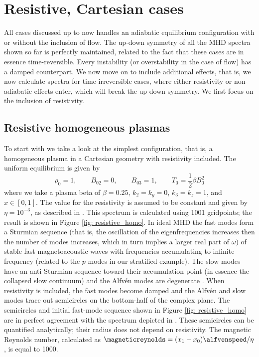 \section{Resistive, Cartesian cases}
All cases discussed up to now handles an adiabatic equilibrium configuration with or without the inclusion of flow. The up-down symmetry of all the MHD spectra shown so far is perfectly maintained, related to the fact that these cases are in essence time-reversible. Every instability (or overstability in the case of flow) has a damped counterpart. We now move on to include additional effects, that is, we now calculate spectra for time-irreversible cases, where either resistivity or non-adiabatic effects enter, which will break the up-down symmetry. We first focus on the inclusion of resistivity.


\subsection{Resistive homogeneous plasmas}
To start with we take a look at the simplest configuration, that is, a homogeneous plasma in a Cartesian geometry with resistivity included. The uniform equilibrium is given by
\begin{equation} \label{eq: resistive_homo_equilibrium}
  \rho_0 = 1,
  \qquad
  B_{02} = 0,
  \qquad
  B_{03} = 1,
  \qquad
  T_0 = \frac{1}{2}\beta B_0^2
\end{equation}
where we take a plasma beta of $\beta = 0.25$, $k_2 = k_y = 0$, $k_3 = k_z = 1$, and $x \in [0, 1]$. The value for the resistivity is assumed to be constant and given by $\eta = 10^{-3}$, as described in \citet{book_MHD}. This spectrum is calculated using 1001 gridpoints; the result is shown in Figure \ref{fig: resistive_homo}. In ideal MHD the fast modes form a Sturmian sequence (that is, the oscillation of the eigenfrequencies increases then the number of modes increases, which in turn implies a larger real part of $\omega$) of stable fast magnetoacoustic waves with frequencies accumulating to infinite frequency (related to the $p$ modes in our stratified example). The slow modes have an anti-Sturmian sequence toward their accumulation point (in essence the collapsed slow continuum) and the Alfv\'en modes are degenerate \citep{book_MHD}. When resistivity is included, the fast modes become damped and the Alfv\'en and slow modes trace out semicircles on the bottom-half of the complex plane. The semicircles and initial fast-mode sequence shown in Figure \ref{fig: resistive_homo} are in perfect agreement with the spectrum depicted in \citet[Figure 14.6]{book_MHD}. These semicircles can be quantified analytically; their radius does not depend on resistivity. The magnetic Reynolds number, calculated as $\magneticreynolds = (x_1 - x_0)\alfvenspeed / \eta$, is equal to 1000.

